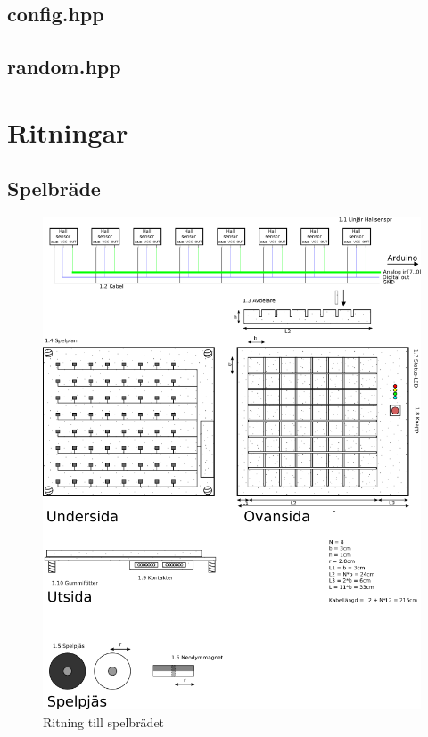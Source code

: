 \documentclass[a4paper]{article}
\begin{document}
\begin{appendix}
\subsection{config.hpp}

\subsection{random.hpp}


\section{Ritningar}
\label{sketches}
\subsection{Spelbräde}
\begin{figure}[!h]\label{board}
\centering
\includegraphics[scale=0.6]{board}
\caption{Ritning till spelbrädet}
\end{figure}


\end{appendix}
\end{document}
